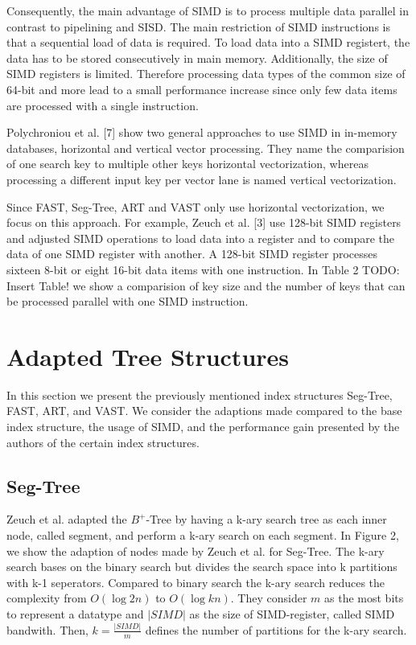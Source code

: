 \documentclass[conference]{IEEEtran}
\begin{document}
Consequently, the main advantage of SIMD is to process multiple data parallel in contrast to pipelining and SISD. The main restriction of SIMD instructions is that a sequential load of data is required. To load data into a SIMD registert, the data has to be stored consecutively in main memory. Additionally, the size of SIMD registers is limited. Therefore processing data types of the common size of 64-bit and more lead to a small performance increase since only few data items are processed with a single instruction.

Polychroniou et al. [7] show two general approaches to use SIMD in in-memory databases, horizontal and vertical vector processing. They name the comparision of one search key to multiple other keys horizontal vectorization, whereas processing a different input key per vector lane is named vertical vectorization.

Since FAST, Seg-Tree, ART and VAST only use horizontal vectorization, we focus on this approach.  For example, Zeuch et al. [3] use 128-bit SIMD registers and adjusted SIMD operations to load data into a register and to compare the data of one SIMD register with another. A 128-bit SIMD register processes sixteen 8-bit or eight 16-bit data items with one instruction. In Table 2 TODO: Insert Table! we show a comparision of key size and the number of keys that can be processed parallel with one SIMD instruction.


\section{Adapted Tree Structures}
In this section we present the previously mentioned index structures Seg-Tree, FAST, ART, and VAST. We consider the adaptions made compared to the base index structure, the usage of SIMD, and the performance gain presented by the authors of the certain index structures.
\subsection{Seg-Tree}\label{SCM}
Zeuch et al. adapted the $B^+$-Tree by having a k-ary search tree as each inner node, called segment, and perform a k-ary search on each segment.  In Figure 2, we show the adaption of nodes made by Zeuch et al. for Seg-Tree. The k-ary search bases on the binary search but divides the search space into k partitions with k-1 seperators. Compared to binary search the k-ary search reduces the complexity from $O(\log{2}{n})$ to $O(\log{k}{n})$. They consider $m$ as the most bits to represent a datatype and $\vert SIMD \vert$ as the size of SIMD-register, called SIMD bandwith. Then, $k = \frac{\vert SIMD \vert }{m}$ defines the number of partitions for the k-ary search. 
\end{document}
